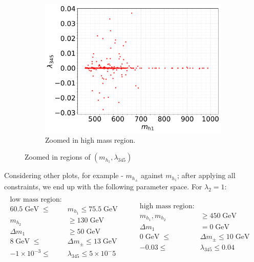 \documentclass[12pt]{article}
\newcommand{\gev}{\mathrel{\text{ GeV}}}
\newcommand{\gevs}{\mathrel{\text{ GeV }}}
\newcommand{\mhone}{m_{h_1}}
\newcommand{\mhtwo}{m_{h_2}}
\newcommand{\mhp}{m_{h_\pm}}
\begin{document}
\begin{figure}[H]
\begin{subfigure}[b]{0.48\textwidth}
        \centering
        \includegraphics[width=\textwidth]{single_plots_(big_range)/l345_against_MD1_Omegah2.pdf}
        \caption{Zoomed in high mass region.}
        \label{fig:l345_md1_zoomed}
    \end{subfigure}
    \caption{Zoomed in regions of $(\mhone,\lambda_{345})$}
\end{figure}

Considering other plots, for example - $\mhp$ against $\mhone$; after applying all constraints, we end up with the following parameter space. For $\lambda_2 = 1$:
\begin{equation}
    {
        \begin{split}
            \\ \text{low mass region:}& 
            \\ 60.5 \gevs \leq &\mhone \leq 75.5 \gevs
            \\  \mhtwo &\geq 130 \gev
            \\  \Delta m_1 & \geq 50 \gev
            \\ 8 \gevs\leq &\Delta m_\pm \leq 13\gev
            \\ -1 \times 10 ^{-3}\leq &\lambda_{345} \leq 5 \times 10^-5
        \end{split}
        }
        \qquad
    {
        \begin{split}
            \\ \text{high mass region:}&
            \\   \mhone, \mhtwo &\geq 450 \gev
            \\   \Delta m_1 & = 0 \gev
            \\0 \gevs\leq &\Delta m_\pm \leq 10\gev
            \\ -0.03 \leq &\lambda_{345} \leq 0.04
        \end{split}
    \text{ }}
\end{equation}
\end{document}

